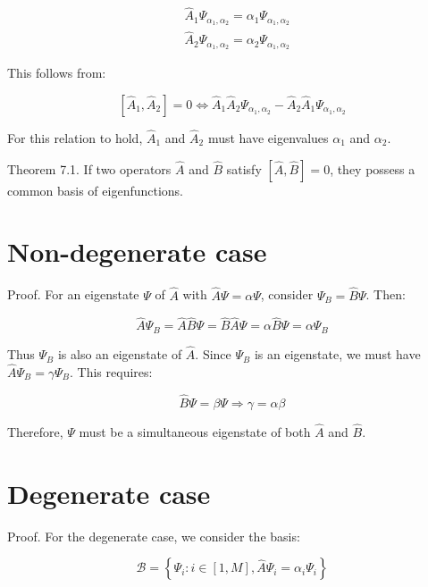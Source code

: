 \documentclass[italian]{HKNdocument}
\begin{document}
\begin{align}
& \hat{A}_{1} \Psi_{\alpha_{1}, \alpha_{2}}=\alpha_{1} \Psi_{\alpha_{1}, \alpha_{2}} \\
& \hat{A}_{2} \Psi_{\alpha_{1}, \alpha_{2}}=\alpha_{2} \Psi_{\alpha_{1}, \alpha_{2}}
\end{align}

This follows from:

\begin{equation}
\left[\hat{A}_{1}, \hat{A}_{2}\right]=0 \Longleftrightarrow \hat{A}_{1} \hat{A}_{2} \Psi_{\alpha_{1}, \alpha_{2}}-\hat{A}_{2} \hat{A}_{1} \Psi_{\alpha_{1}, \alpha_{2}}
\end{equation}

For this relation to hold, $\hat{A}_1$ and $\hat{A}_2$ must have eigenvalues $\alpha_1$ and $\alpha_2$.

Theorem 7.1. If two operators $\hat{A}$ and $\hat{B}$ satisfy $[\hat{A}, \hat{B}]=0$, they possess a common basis of eigenfunctions.

\section{Non-degenerate case}
Proof. For an eigenstate $\Psi$ of $\hat{A}$ with $\hat{A} \Psi=\alpha \Psi$, consider $\Psi_{B}=\hat{B} \Psi$. Then:

\begin{equation}
\hat{A} \Psi_{B}=\hat{A} \hat{B} \Psi=\hat{B} \hat{A} \Psi=\alpha \hat{B} \Psi=\alpha \Psi_{B}
\end{equation}

Thus $\Psi_{B}$ is also an eigenstate of $\hat{A}$. Since $\Psi_B$ is an eigenstate, we must have $\hat{A} \Psi_{B}=\gamma \Psi_{B}$. This requires:

\begin{equation}
\hat{B} \Psi=\beta \Psi \Longrightarrow \gamma=\alpha \beta
\end{equation}

Therefore, $\Psi$ must be a simultaneous eigenstate of both $\hat{A}$ and $\hat{B}$.

\section{Degenerate case}
Proof. For the degenerate case, we consider the basis:

\begin{equation}
\mathcal{B}=\left\{\Psi_{i}: i \in[1, M], \hat{A} \Psi_{i}=\alpha_{i} \Psi_{i}\right\}
\end{equation}
\end{document}
